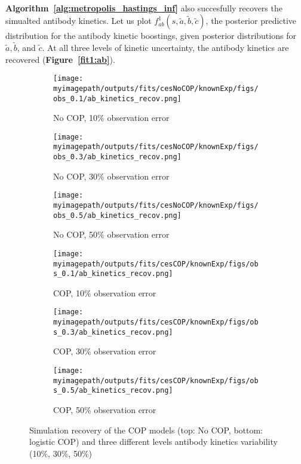 \documentclass{article}
\newcommand{\myimagepath}{/Users/davidhodgson/Dropbox/Mac (3)/Documents/research/Rpackages/rjmc/}
\begin{document}
\paragraph{} \textbf{Algorithm~\ref{alg:metropolis_hastings_inf}} also succesfully recovers the simualted antibody kinetics. Let us plot $f^1_{ab}(s, \tilde{a}, \tilde{b}, \tilde{c})$, the posterior predictive distribution for the antibody kinetic boostings, given posterior distributions for $ \tilde{a}, \tilde{b}$, and $\tilde{c}$. At all three levels of kinetic uncertainty, the antibody kinetics are recovered (\textbf{Figure~\ref{fit1:ab}}).

\begin{figure}[H]
\label{fit1:ab}
    \centering
    \begin{subfigure}{0.31\textwidth}
        \centering
        \texttt{[image: \\myimagepath/outputs/fits/cesNoCOP/knownExp/figs/obs\_0.1/ab\_kinetics\_recov.png]}
        \caption{No COP, 10\% observation error}
    \end{subfigure}
    \begin{subfigure}{0.31\textwidth}
        \centering
        \texttt{[image: \\myimagepath/outputs/fits/cesNoCOP/knownExp/figs/obs\_0.3/ab\_kinetics\_recov.png]}
        \caption{No COP, 30\% observation error}
    \end{subfigure}
    \begin{subfigure}{0.31\textwidth}
        \centering
        \texttt{[image: \\myimagepath/outputs/fits/cesNoCOP/knownExp/figs/obs\_0.5/ab\_kinetics\_recov.png]}
        \caption{No COP, 50\% observation error}
    \end{subfigure}
    
  \begin{subfigure}{0.31\textwidth}
        \centering
        \texttt{[image: \\myimagepath/outputs/fits/cesCOP/knownExp/figs/obs\_0.1/ab\_kinetics\_recov.png]}
        \caption{ COP, 10\% observation error}
    \end{subfigure}
    \begin{subfigure}{0.31\textwidth}
        \centering
        \texttt{[image: \\myimagepath/outputs/fits/cesCOP/knownExp/figs/obs\_0.3/ab\_kinetics\_recov.png]}
        \caption{ COP, 30\% observation error}
    \end{subfigure}
    \begin{subfigure}{0.31\textwidth}
        \centering
        \texttt{[image: \\myimagepath/outputs/fits/cesCOP/knownExp/figs/obs\_0.5/ab\_kinetics\_recov.png]}
        \caption{ COP, 50\% observation error}
    \end{subfigure}
    
    \caption{Simulation recovery of the COP models (top: No COP, bottom: logistic COP) and three different levels antibody kinetics variability (10\%, 30\%, 50\%)}
\end{figure}
\end{document}
